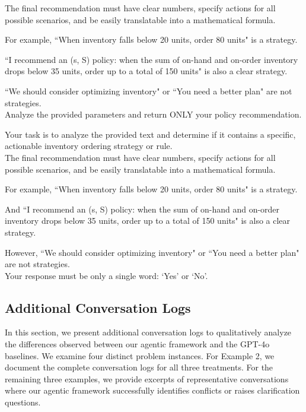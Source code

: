 \documentclass[mnsc,nonblindrev]{informs3_hide}
\begin{document}
\begin{APPENDICES}
\begin{table}[h]
\begin{tcolorbox}
The final recommendation must have clear numbers, specify actions for all
possible scenarios, and be easily translatable into a mathematical formula.

For example, ``When inventory falls below 20 units, order 80 units" is a strategy.

``I recommend an (s, S) policy: when the sum of on-hand and on-order inventory
drops below 35 units, order up to a total of 150 units" is also a clear strategy.

``We should consider optimizing inventory" or ``You need a better plan" are
not strategies.\\[0pt]

Analyze the provided parameters and return ONLY your policy recommendation.
    \end{tcolorbox}
    \caption{System prompt for GPT-4o (Parameter Input)}
    \label{tab:system_prompt_gpt_params}
    \end{table}


    \begin{table}[h]
    \begin{tcolorbox}
    \scriptsize
    
    Your task is to analyze the provided text and determine if it contains a
    specific, actionable inventory ordering strategy or rule.\\[0pt]

    The final recommendation must have clear numbers, specify actions for all
    possible scenarios, and be easily translatable into a mathematical formula.
    
    For example, ``When inventory falls below 20 units, order 80 units" is a strategy.
    
    And ``I recommend an (s, S) policy: when the sum of on-hand and on-order inventory
    drops below 35 units, order up to a total of 150 units" is also a clear strategy.
    
    However, ``We should consider optimizing inventory" or ``You need a better plan"
    are not strategies.\\[0pt]

    Your response must be only a single word: `Yes' or `No'.
    \end{tcolorbox}
    \caption{System prompt for LLM Judge}
    \label{tab:system_prompt_llm_judge}
    \end{table}

    
\clearpage

\subsection{Additional Conversation Logs}\label{sec:sample_conversation}
In this section, we present additional conversation logs to qualitatively analyze the differences observed between our agentic framework and the GPT-4o baselines. We examine four distinct problem instances. For Example 2, we document the complete conversation logs for all three treatments. For the remaining three examples, we provide excerpts of representative conversations where our agentic framework successfully identifies conflicts or raises clarification questions.



\end{APPENDICES}
\end{document}
